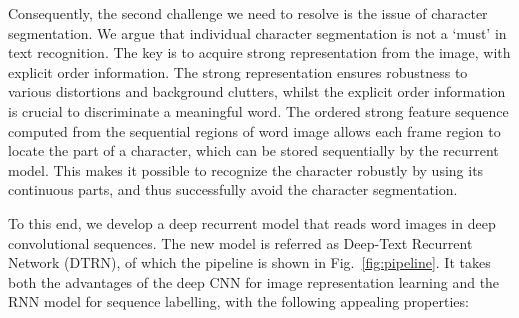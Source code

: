 \documentclass[letterpaper]{article}
\begin{document}

Consequently, the second challenge we need to resolve is the issue of character segmentation.
%
We argue that individual character segmentation is not a `must' in text recognition. The key is to acquire strong representation from the image, with explicit order information. The strong representation ensures robustness to various distortions and background clutters, whilst the explicit order information is crucial to discriminate a meaningful word.
The ordered strong feature sequence computed from the sequential regions of word image allows each frame region to locate the part of a character, which can be stored sequentially by the recurrent model. This makes it possible to recognize the character robustly by using its continuous parts, and thus successfully avoid the character segmentation.




To this end, we develop a deep recurrent model that reads word images in deep convolutional sequences. The new model is referred as Deep-Text Recurrent Network (DTRN), of which the pipeline is shown in Fig.~\ref{fig:pipeline}. It takes both the advantages of the deep CNN for image representation learning and the RNN model for sequence labelling, with the following appealing properties:
\end{document}
